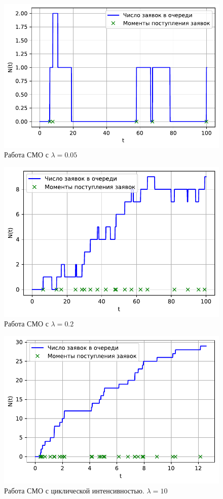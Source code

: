 \documentclass[16pt]{article}
\begin{document}
\begin{figure}
	\center
	\includegraphics[scale=0.7]{11_2.pdf}
	\caption{Работа СМО с $\lambda = 0.05$}
\end{figure}

\begin{figure}
	\center
	\includegraphics[scale=0.7]{11_3.pdf}
	\caption{Работа СМО с $\lambda = 0.2$}
\end{figure}

\begin{figure}
	\center
	\includegraphics[scale=0.7]{11_4.pdf}
	\caption{Работа СМО с циклической интенсивностью. $\lambda = 10$}
\end{figure}
\end{document}
